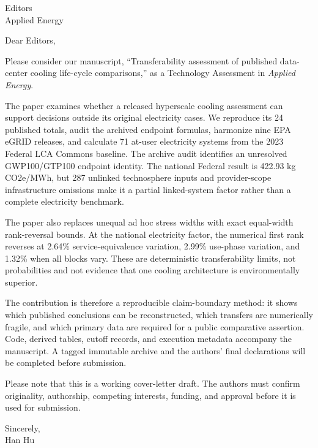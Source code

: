 \documentclass[11pt]{letter}
\begin{document}
\begin{letter}{Editors\\Applied Energy}
\opening{Dear Editors,}

Please consider our manuscript, ``Transferability assessment of published
data-center cooling life-cycle comparisons,'' as a Technology Assessment in
\emph{Applied Energy}.

The paper examines whether a released hyperscale cooling assessment can support
decisions outside its original electricity cases. We reproduce its 24 published
totals, audit the archived endpoint formulas, harmonize nine EPA eGRID releases,
and calculate 71 at-user electricity systems from the 2023 Federal LCA Commons
baseline. The archive audit identifies an unresolved GWP100/GTP100 endpoint
identity. The national Federal result is 422.93 kg CO2e/MWh, but 287 unlinked
technosphere inputs and provider-scope infrastructure omissions make it a
partial linked-system factor rather than a complete electricity benchmark.

The paper also replaces unequal ad hoc stress widths with exact equal-width
rank-reversal bounds. At the national electricity factor, the numerical first
rank reverses at 2.64\% service-equivalence variation, 2.99\% use-phase
variation, and 1.32\% when all blocks vary. These are deterministic
transferability limits, not probabilities and not evidence that one cooling
architecture is environmentally superior.

The contribution is therefore a reproducible claim-boundary method: it shows
which published conclusions can be reconstructed, which transfers are
numerically fragile, and which primary data are required for a public
comparative assertion. Code, derived tables, cutoff records, and execution
metadata accompany the manuscript. A tagged immutable archive and the authors'
final declarations will be completed before submission.

Please note that this is a working cover-letter draft. The authors must confirm
originality, authorship, competing interests, funding, and approval before it is
used for submission.

\closing{Sincerely,\\Han Hu}
\end{letter}
\end{document}
